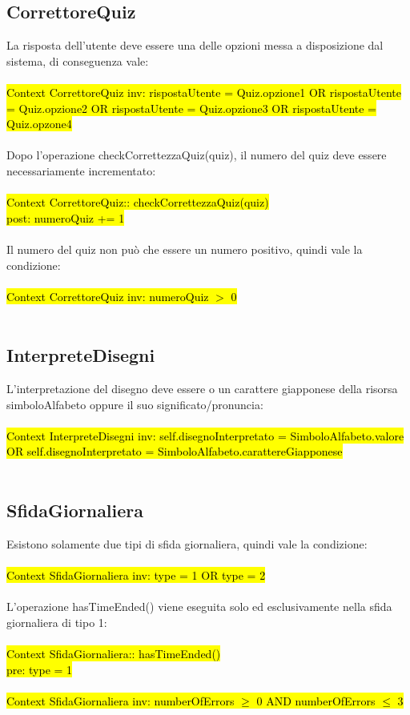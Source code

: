 \subsection{CorrettoreQuiz}
La risposta dell'utente deve essere una delle opzioni messa a disposizione dal sistema, di conseguenza vale: \\
\\
\hl{Context CorrettoreQuiz inv: rispostaUtente = Quiz.opzione1 OR rispostaUtente = Quiz.opzione2 OR rispostaUtente = Quiz.opzione3 OR rispostaUtente = Quiz.opzone4} \\
\\
Dopo l'operazione checkCorrettezzaQuiz(quiz), il numero del quiz deve essere necessariamente incrementato: \\
\\
\hl{Context CorrettoreQuiz:: checkCorrettezzaQuiz(quiz) \\
post: numeroQuiz += 1} \\
\\
Il numero del quiz non può che essere un numero positivo, quindi vale la condizione: \\
\\
\hl{Context CorrettoreQuiz inv: numeroQuiz $>$ 0} \\
\\

\subsection{InterpreteDisegni}
L'interpretazione del disegno deve essere o un carattere giapponese della risorsa simboloAlfabeto oppure il suo significato/pronuncia: \\
\\
\hl{Context InterpreteDisegni inv: self.disegnoInterpretato = SimboloAlfabeto.valore OR self.disegnoInterpretato = SimboloAlfabeto.carattereGiapponese} \\
\\

\subsection{SfidaGiornaliera}
Esistono solamente due tipi di sfida giornaliera, quindi vale la condizione: \\
\\
\hl{Context SfidaGiornaliera inv: type = 1 OR type = 2} \\
\\
L'operazione hasTimeEnded() viene eseguita solo ed esclusivamente nella sfida giornaliera di tipo 1: \\
\\
\hl{Context SfidaGiornaliera:: hasTimeEnded() \\
pre: type = 1 \\}
\\
\hl{Context SfidaGiornaliera inv: numberOfErrors $\geq$ 0 AND numberOfErrors $\leq$ 3}
